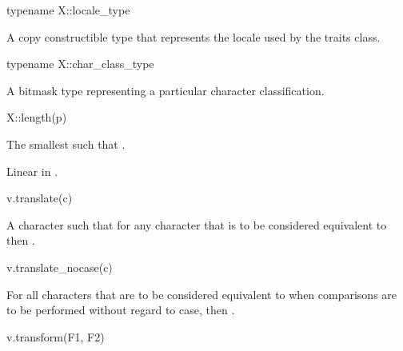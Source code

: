 \begin{itemdecl}
typename X::locale_type
\end{itemdecl}

\begin{itemdescr}
\pnum
\result
A copy constructible type
that represents the locale used by the traits class.
\end{itemdescr}

\begin{itemdecl}
typename X::char_class_type
\end{itemdecl}

\begin{itemdescr}
\pnum
\result
A bitmask type
representing a particular character classification.
\end{itemdescr}

\begin{itemdecl}
X::length(p)
\end{itemdecl}

\begin{itemdescr}
\pnum
\result
{}

\pnum
\returns
The smallest  such that .

\pnum
\complexity
Linear in .
\end{itemdescr}

\begin{itemdecl}
v.translate(c)
\end{itemdecl}

\begin{itemdescr}
\pnum
\result
{}

\pnum
\returns
A character such that for any character 
that is to be considered equivalent to 
then .
\end{itemdescr}

\begin{itemdecl}
v.translate_nocase(c)
\end{itemdecl}

\begin{itemdescr}
\pnum
\result
{}

\pnum
\returns
For all characters  that are to be considered equivalent to 
when comparisons are to be performed without regard to case,
then .
\end{itemdescr}

\begin{itemdecl}
v.transform(F1, F2)
\end{itemdecl}


